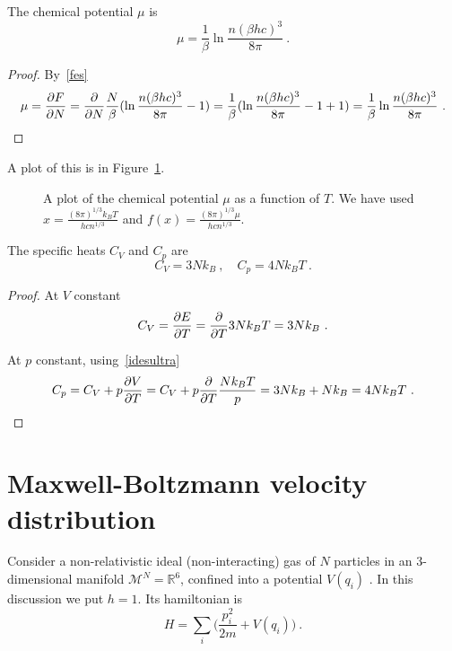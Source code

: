     The chemical potential $\mu$ is 
    \begin{equation*}
        \mu = \frac{1}{\beta} \ln \frac{n (\beta h c)^3}{8\pi} ~.
    \end{equation*}
    \begin{proof}
        By~\eqref{fes}
        \begin{equation*}
            \mu = \frac{\partial F}{\partial N} = \frac{\partial}{\partial N} \frac{N}{\beta} (\ln \frac{n (\beta h c)^3}{8\pi} - 1) = \frac{1}{\beta} (\ln \frac{n (\beta h c)^3}{8\pi} - 1 + 1) = \frac{1}{\beta} \ln \frac{n (\beta h c)^3}{8\pi} ~.
        \end{equation*}
    \end{proof}
    A plot of this is in Figure~\ref{can:mu3}.
    \begin{figure}[h!]
        \centering
        \caption{A plot of the chemical potential $\mu$ as a function of $T$. We have used $x = \frac{(8 \pi)^{1/3} k_B T}{h c n^{1/3}}$ and $f(x) = \frac{(8 \pi)^{1/3} \mu}{h c n^{1/3}}$.}
        \label{can:mu3}
    \end{figure}

    The specific heats $C_V$ and $C_p$ are 
    \begin{equation*}
        C_V = 3 N k_B ~, \quad C_p = 4 N k_B T ~. 
    \end{equation*}
    \begin{proof}
        At $V$ constant
        \begin{equation*}
            C_V = \frac{\partial E}{\partial T} = \frac{\partial}{\partial T} 3 N k_B T = 3 N k_B ~.
        \end{equation*}

        At $p$ constant, using~\eqref{idesultra}
        \begin{equation*}
            C_p = C_V + p \frac{\partial V}{\partial T} =  C_V + p \frac{\partial}{\partial T} \frac{N k_B T}{p} = 3 N k_B + N k_B = 4 N k_B T ~.
        \end{equation*}
    \end{proof}

\section{Maxwell-Boltzmann velocity distribution}

    Consider a non-relativistic ideal (non-interacting) gas of $N$ particles in an $3$-dimensional manifold $\mathcal M^N = \mathbb R^6$, confined into a potential $V(q_i)$ . In this discussion we put $h = 1$. Its hamiltonian is 
    \begin{equation*}
        H = \sum_i \Big ( \frac{p^2_i}{2m} + V(q_i) \Big ) ~.
    \end{equation*}

